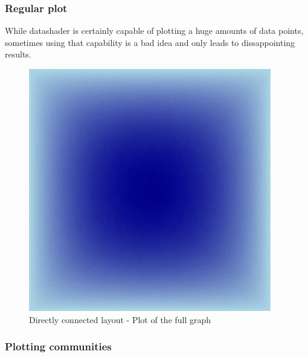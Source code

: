 \documentclass[12pt, a4paper]{article}
\begin{document}


\subsubsection{Regular plot}




While datashader is certainly capable of plotting a huge amounts of data points, sometimes using that capability is a bad idea and only leads to dissappointing results.

\begin{figure}
    \centering
    \includegraphics[width=\textwidth]{src/youtube/datashader/simple/fullgraph}
    \caption{Directly connected layout - Plot of the full graph}
    \label{fig:ds_fullgraph}
\end{figure}

\subsubsection{Plotting communities}
\end{document}
